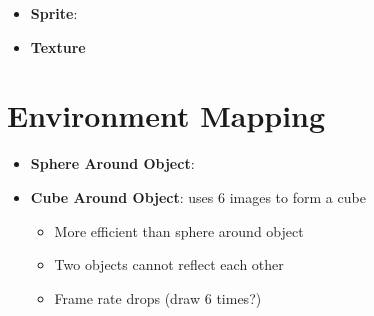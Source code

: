   \begin{itemize}
    \item \textbf{Sprite}:
    \item \textbf{Texture}
  \end{itemize}

\section{Environment Mapping}

  \begin{itemize}
    \item \textbf{Sphere Around Object}:
    \item \textbf{Cube Around Object}: uses 6 images to form a cube
    \begin{itemize}
      \item More efficient than sphere around object
      \item Two objects cannot reflect each other
      \item Frame rate drops (draw 6 times?)
    \end{itemize}
  \end{itemize}
